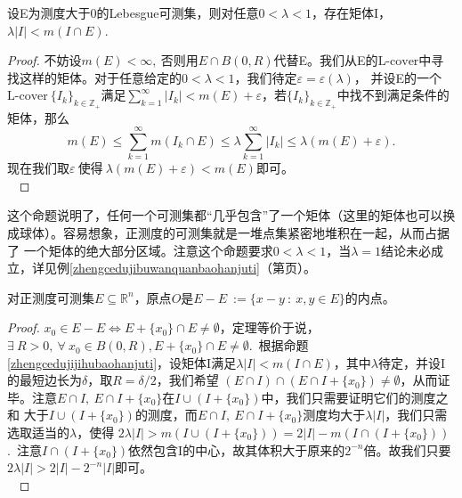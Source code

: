 \documentclass[color=green,thmcnt=section,lang=cn,12pt]{elegantbook}
\numberwithin{equation}{section}%
\numberwithin{figure}{section}%
\newcommand{\RR}{\mathbb{R}}
\renewcommand{\RN}{\RR^n}
\newcommand{\ZZ}{\mathbb{Z}}
\newcommand{\ee}{\varepsilon}
\newcommand{\any}{\forall \ }
\newcommand{\exi}{\exists \ }
\newcommand{\csf}[1]{\{#1_k\}_{k\in \ZZ_+}} %
\newcommand{\cs}[1]{\sum_{#1=1}^{\infty}} %
\newcommand{\lcover}{\textrm{L-cover}} %
\newcommand{\p}[1]{（第\pageref{#1}页）}
\newcommand{\refp}[1]{\ref{#1}\p{#1}}
\begin{document}
\begin{proposition}\label{zhengcedujijihubaohanjuti}
    设E为测度大于0的Lebesgue可测集，则对任意$0<\lambda<1$，存在矩体I，$\lambda |I|<m(I\cap E)$.\ 
\end{proposition}
\begin{proof}
    不妨设$m(E)<\infty,\ $否则用$E\cap B(0,R)$代替E。我们从E的$\lcover$中寻找这样的矩体。对于任意给定的$0<\lambda<1$，我们待定$\ee=\ee(\lambda)$，
    并设E的一个$\lcover\ \csf{I}$满足$\cs{k}|I_k|<m(E)+\ee$，若$\csf{I}$中找不到满足条件的矩体，那么
    \begin{equation*}
        m(E)\leq \cs{k}m(I_k\cap E) \leq \lambda\cs{k}|I_k|\leq \lambda (m(E)+\ee).
    \end{equation*}
现在我们取$\ee\ \mbox{使得}\ \lambda(m(E)+\ee)<m(E)$即可。\\
    \ 
\end{proof}
这个命题说明了，任何一个可测集都``几乎包含''了一个矩体（这里的矩体也可以换成球体）。容易想象，正测度的可测集就是一堆点集紧密地堆积在一起，从而占据了
一个矩体的绝大部分区域。注意这个命题要求$0<\lambda<1$，当$\lambda=1$结论未必成立，详见例\refp{zhengcedujibuwanquanbaohanjuti}。


\begin{theorem}[Steinhaus定理]\label{steinhuasdingli}
    对正测度可测集$E\subseteq \RN$，原点$O$是$E-E\ :=\{x-y\ :\ x,y\in E\}$的内点。
\end{theorem}

\begin{proof}
    $x_0\in E-E \Longleftrightarrow E+\{x_0\}\cap E \neq \emptyset$，定理等价于说，$\exi R>0,\ \any x_0\in B(0,R),E+\{x_0\}\cap E \neq \emptyset$.\ 
根据命题\ref{zhengcedujijihubaohanjuti}，设矩体I满足$\lambda |I|<m(I\cap E)$，其中$\lambda$待定，并设I的最短边长为$\delta$，取$R=\delta/2$，我们希望
$(E\cap I) \cap(E\cap I+\{x_0\})\neq \emptyset$，从而证毕。注意$E\cap I,\ E\cap I+\{x_0\}$在$I\cup (I+\{x_0\})$中，我们只需要证明它们的测度之和
大于$I\cup (I+\{x_0\})$的测度，而$E\cap I,\ E\cap I+\{x_0\}$测度均大于$\lambda |I|$，我们只需选取适当的$\lambda$，使得
$2\lambda |I|>m(I\cup (I+\{x_0\}))=2|I|-m(I\cap (I+\{x_0\}))$.\ 注意$I\cap (I+\{x_0\})$依然包含I的中心，故其体积大于原来的$2^{-n}$倍。故我们只要
$2\lambda |I|>2|I|-2^{-n}|I|$即可。\\
\ 
\end{proof}
\end{document}
